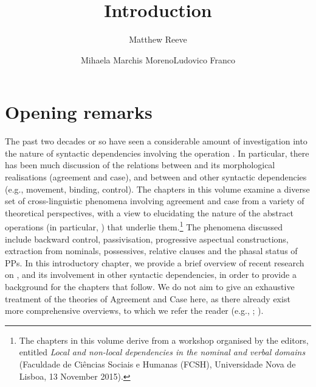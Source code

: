\documentclass[output=paper]{langsci/langscibook}
\author{Matthew Reeve\affiliation{Zhejiang University}\and Mihaela Marchis Moreno\affiliation{FCSH, Universidade Nova de Lisboa}\lastand Ludovico Franco\affiliation{Università degli Studi di Firenze}}
\title{Introduction}
\begin{document}
\section{Opening remarks}

The past two decades or so have seen a considerable amount of investigation into the nature of syntactic dependencies involving the operation . In particular, there has been much discussion of the relations between  and its morphological realisations (agreement and case), and between  and other syntactic dependencies (e.g., movement, binding, control). The chapters in this volume examine a diverse set of cross-linguistic phenomena involving agreement and case from a variety of theoretical perspectives, with a view to elucidating the nature of the abstract operations (in particular, ) that underlie them.\footnote{The chapters in this volume derive from a workshop organised by the editors, entitled \textit{Local and non-local dependencies in the nominal and verbal domains} (Faculdade de Ciências Sociais e Humanas (FCSH), Universidade Nova de Lisboa, 13 November 2015).} The phenomena discussed include backward control, passivisation, progressive aspectual constructions, extraction from nominals, possessives, relative clauses and the phasal status of PPs. In this introductory chapter, we provide a brief overview of recent research on , and its involvement in other syntactic dependencies, in order to provide a background for the chapters that follow. We do not aim to give an exhaustive treatment of the theories of Agreement and Case here, as there already exist more comprehensive overviews, to which we refer the reader (e.g., \citealt{Bobaljik2008Case}; \citealt{Polinsky2014}).
\end{document}

